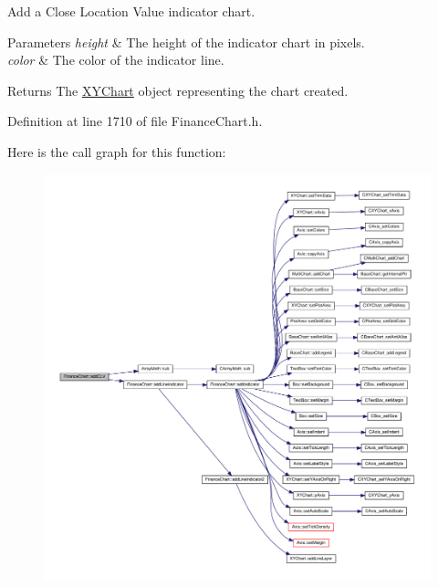 Add a Close Location Value indicator chart. 


\begin{DoxyParams}{Parameters}
{\em height} & The height of the indicator chart in pixels.\\
\hline
{\em color} & The color of the indicator line.\\
\hline
\end{DoxyParams}
\begin{DoxyReturn}{Returns}
The \hyperlink{class_x_y_chart}{X\+Y\+Chart} object representing the chart created.
\end{DoxyReturn}


Definition at line 1710 of file Finance\+Chart.\+h.

Here is the call graph for this function\+:
\nopagebreak
\begin{figure}[H]
\begin{center}
\leavevmode
\includegraphics[width=350pt]{class_finance_chart_a1541d5239c097f1f35b426830d569bc8_cgraph}
\end{center}
\end{figure}
\mbox{\label{class_finance_chart_a70070d425a15afa754f1d76e1d5f9dfc}} 
